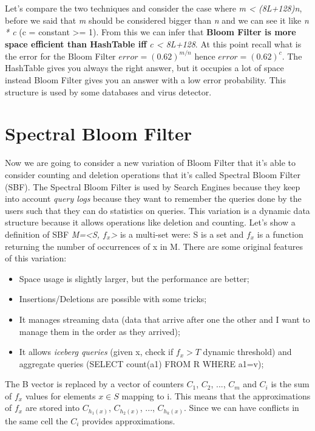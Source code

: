Let's compare the two techniques and consider the case where \textit{m < (8L+128)n}, before we said that \textit{m} should be considered bigger than \textit{n} and we can see it like \textit{n * c} (c = constant >= 1).\newline
From this we can infer that \textbf{Bloom Filter is more space efficient than HashTable iff} \textit{c < 8L+128}.\newline
At this point recall what is the error for the Bloom Filter $error=(0.62)^{m/n}$ hence $error=(0.62)^c$. \newline
The HashTable gives you always the right answer, but it occupies a lot of space instead Bloom Filter gives you an answer with a low error probability. This structure is used by some databases and virus detector.\newline
\section{Spectral Bloom Filter}
Now we are going to consider a new variation of Bloom Filter that it's able to consider counting and deletion operations that it's called Spectral Bloom Filter (SBF). The Spectral Bloom Filter is used by Search Engines because they keep into account \textit{query logs} because they want to remember the queries done by the users such that they can do statistics on queries. This variation is a dynamic data structure because it allows operations like deletion and counting.\newline
Let's show a definition of SBF \textit{M=<S, $f_x$>} is a multi-set were: S is a set and $f_x$ is a function returning the number of occurrences of x in M.\newline
There are some original features of this variation:
\begin{itemize}
    \item Space usage is slightly larger, but the performance are better;
    \item Insertions/Deletions are possible with some tricks;
    \item It manages streaming data (data that arrive after one the other and I want to manage them in the order as they arrived);
    \item It allows \textit{iceberg queries} (given x, check if $f_x > T$ dynamic threshold) and aggregate queries (SELECT count(a1) FROM R WHERE a1=v);
\end{itemize}
The B vector is replaced by a vector of counters $C_1$, $C_2$, ..., $C_m$ and $C_i$ is the sum of $f_x$ values for elements $x \in S$ mapping to i. This means that the approximations of $f_x$ are stored into $C_{h_1(x)}$, $C_{h_2(x)}$, ..., $C_{h_k(x)}$. Since we can have conflicts in the same cell the $C_i$ provides approximations.\newline
